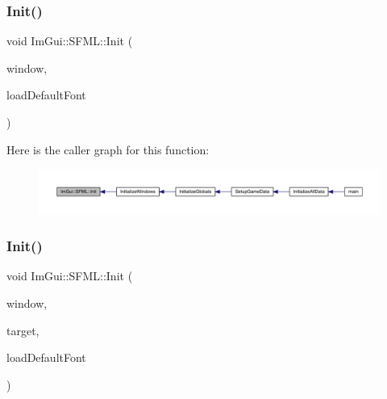 \mbox{\label{namespace_im_gui_1_1_s_f_m_l_ab68ea5215c08d005c6db5e5995c111ad}} 
\subsubsection{\texorpdfstring{Init()}{Init()}\hspace{0.1cm}{\footnotesize\ttfamily [1/2]}}
{\footnotesize\ttfamily void Im\+Gui\+::\+S\+F\+M\+L\+::\+Init (\begin{DoxyParamCaption}\item[{sf\+::\+Render\+Window \&}]{window,  }\item[{bool}]{load\+Default\+Font }\end{DoxyParamCaption})}

Here is the caller graph for this function\+:
\nopagebreak
\begin{figure}[H]
\begin{center}
\leavevmode
\includegraphics[width=350pt]{d1/d76/namespace_im_gui_1_1_s_f_m_l_ab68ea5215c08d005c6db5e5995c111ad_icgraph}
\end{center}
\end{figure}
\mbox{\label{namespace_im_gui_1_1_s_f_m_l_a52384615894fc35d07dfaccb1bcdb514}} 
\subsubsection{\texorpdfstring{Init()}{Init()}\hspace{0.1cm}{\footnotesize\ttfamily [2/2]}}
{\footnotesize\ttfamily void Im\+Gui\+::\+S\+F\+M\+L\+::\+Init (\begin{DoxyParamCaption}\item[{sf\+::\+Window \&}]{window,  }\item[{sf\+::\+Render\+Target \&}]{target,  }\item[{bool}]{load\+Default\+Font }\end{DoxyParamCaption})}

